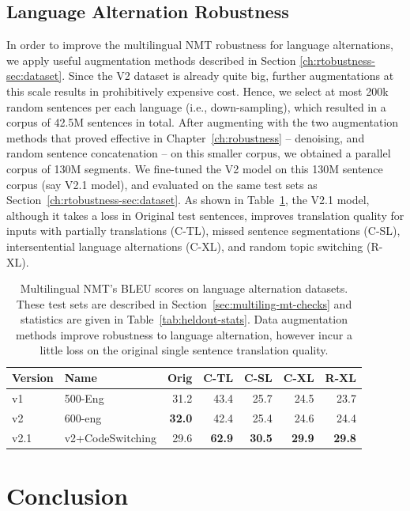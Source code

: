\subsection{Language Alternation Robustness}

In order to improve the multilingual NMT robustness for language alternations, we apply useful augmentation methods described in Section \ref{ch:rtobustness-sec:dataset}. 
Since the V2 dataset is already quite big, further augmentations at this scale results in prohibitively expensive cost. 
Hence, we select at most 200k random sentences per each language (i.e., down-sampling), which resulted in a corpus of 42.5M sentences in total. 
After augmenting with the two augmentation methods that proved effective in Chapter~\ref{ch:robustness} -- denoising, and random sentence concatenation -- on this smaller corpus, we obtained a parallel corpus of 130M segments. 
We fine-tuned the V2 model on this 130M sentence corpus (say V2.1 model), and evaluated on the same test sets as Section~\ref{ch:rtobustness-sec:dataset}. 
As shown in Table~\ref{tab:many-eng-v2-robustness}, the V2.1 model, although it takes a loss in Original test sentences, improves translation quality for inputs with partially translations (C-TL), missed sentence segmentations (C-SL), intersentential language alternations (C-XL), and random topic switching (R-XL). 

\begin{table}[ht]
    \centering
    \begin{tabular}{llrrrrr}
    \hline 
Version & Name & Orig & C-TL & C-SL & C-XL & R-XL \\ \hline \hline 
v1 & 500-Eng & 31.2 & 43.4 & 25.7 & 24.5 & 23.7 \\
v2 & 600-eng & \textbf{32.0} & 42.4 & 25.4 & 24.6 & 24.4 \\
v2.1 & v2+CodeSwitching & 29.6 & \textbf{62.9} & \textbf{30.5} & \textbf{29.9} & \textbf{29.8} \\ \hline 
\end{tabular} 
    \caption{Multilingual NMT's BLEU scores on language alternation datasets. These test sets are described in Section~\ref{sec:multiling-mt-checks} and statistics are given in Table~\ref{tab:heldout-stats}. 
    Data augmentation methods improve robustness to language alternation, however incur a little loss on the original single sentence translation quality.}
    \label{tab:many-eng-v2-robustness}
\end{table}


\section{Conclusion}

